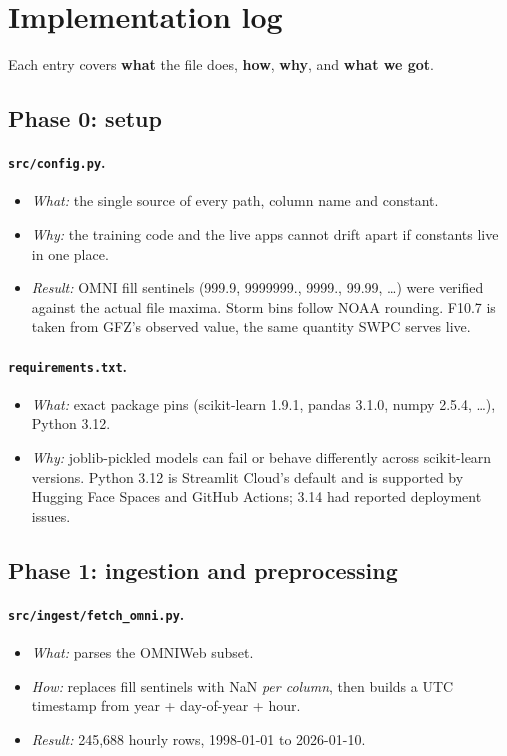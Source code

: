 \documentclass[11pt,a4paper]{article}
\newcommand{\code}[1]{\texttt{#1}}
\begin{document}
\section{Implementation log}
Each entry covers \textbf{what} the file does, \textbf{how}, \textbf{why}, and \textbf{what we got}.

\subsection{Phase 0: setup}
\paragraph{\code{src/config.py}.}
\begin{itemize}
\item \textit{What:} the single source of every path, column name and constant.
\item \textit{Why:} the training code and the live apps cannot drift apart if constants live in one place.
\item \textit{Result:} OMNI fill sentinels (999.9, 9999999., 9999., 99.99, \dots) were verified against the
actual file maxima. Storm bins follow NOAA rounding. F10.7 is taken from GFZ's observed value, the same quantity
SWPC serves live.
\end{itemize}

\paragraph{\code{requirements.txt}.}
\begin{itemize}
\item \textit{What:} exact package pins (scikit-learn 1.9.1, pandas 3.1.0, numpy 2.5.4, \dots), Python 3.12.
\item \textit{Why:} joblib-pickled models can fail or behave differently across scikit-learn versions. Python
3.12 is Streamlit Cloud's default and is supported by Hugging Face Spaces and GitHub Actions; 3.14 had reported
deployment issues.
\end{itemize}

\subsection{Phase 1: ingestion and preprocessing}
\paragraph{\code{src/ingest/fetch\_omni.py}.}
\begin{itemize}
\item \textit{What:} parses the OMNIWeb subset.
\item \textit{How:} replaces fill sentinels with NaN \emph{per column}, then builds a UTC timestamp from
year + day-of-year + hour.
\item \textit{Result:} 245{,}688 hourly rows, 1998-01-01 to 2026-01-10.
\end{itemize}
\end{document}
